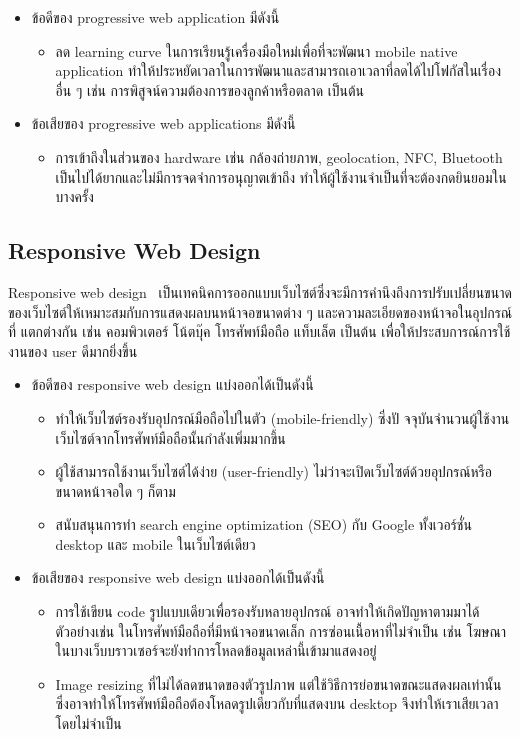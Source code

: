 \begin{itemize}
  \item ข้อดีของ progressive web application มีดังนี้
  \begin{itemize}
    \item ลด learning curve ในการเรียนรู้เครื่องมือใหม่เพื่อที่จะพัฒนา mobile native application ทำให้ประหยัดเวลาในการพัฒนาและสามารถเอาเวลาที่ลดได้ไปโฟกัสในเรื่องอื่น ๆ เช่น การพิสูจน์ความต้องการของลูกค้าหรือตลาด เป็นต้น
  \end{itemize}
  \item ข้อเสียของ progressive web applications มีดังนี้~\cite{bad_pwa}
  \begin{itemize}
    \item การเข้าถึงในส่วนของ hardware เช่น กล้องถ่ายภาพ, geolocation, NFC, Bluetooth เป็นไปได้ยากและไม่มีการจดจำการอนุญาตเข้าถึง ทำให้ผู้ใช้งานจำเป็นที่จะต้องกดยินยอมในบางครั้ง
  \end{itemize}

\end{itemize}

\subsection{Responsive Web Design}
Responsive web design~\cite{responsive} เป็นเทคนิคการออกแบบเว็บไซต์ซึ่งจะมีการคํานึงถึงการปรับเปลี่ยนขนาดของเว็บไซต์ให้เหมาะสมกับการแสดงผลบนหน้าจอขนาดต่าง ๆ และความละเอียดของหน้าจอในอุปกรณ์ที่
แตกต่างกัน เช่น คอมพิวเตอร์ โน้ตบุ๊ค โทรศัพท์มือถือ แท็บเล็ต เป็นต้น เพื่อให้ประสบการณ์การใช้งานของ user ดีมากยิ่งขึ้น
\begin{itemize}
  \item ข้อดีของ responsive web design แบ่งออกได้เป็นดังนี้
  \begin{itemize}
    \item ทําให้เว็บไซต์รองรับอุปกรณ์มือถือไปในตัว (mobile-friendly) ซึ่งปั จจุบันจํานวนผู้ใช้งานเว็บไซต์จากโทรศัพท์มือถือนั้นกําลังเพิ่มมากขึ้น
    \item ผู้ใช้สามารถใช้งานเว็บไซต์ได้ง่าย (user-friendly) ไม่ว่าจะเปิดเว็บไซต์ด้วยอุปกรณ์หรือขนาดหน้าจอใด ๆ ก็ตาม
    \item สนับสนุนการทํา search engine optimization (SEO) กับ Google ทั้งเวอร์ชั่น desktop และ mobile ในเว็บไซต์เดียว
  \end{itemize}
  \item ข้อเสียของ responsive web design แบ่งออกได้เป็นดังนี้~\cite{bad_responsive}
  \begin{itemize}
    \item การใช้เขียน code รูปแบบเดียวเพื่อรองรับหลายอุปกรณ์ อาจทําให้เกิดปัญหาตามมาได้ ตัวอย่างเช่น ในโทรศัพท์มือถือที่มีหน้าจอขนาดเล็ก การซ่อนเนื้อหาที่ไม่จําเป็น เช่น โฆษณา ในบางเว็บบราวเซอร์จะยังทําการโหลดข้อมูลเหล่านี้เข้ามาแสดงอยู่
    \item Image resizing ที่ไม่ได้ลดขนาดของตัวรูปภาพ แต่ใช้วิธีการย่อขนาดขณะแสดงผลเท่านั้น ซึ่งอาจทําให้โทรศัพท์มือถือต้องโหลดรูปเดียวกับที่แสดงบน desktop จึงทําให้เราเสียเวลาโดยไม่จําเป็น
  \end{itemize}
\end{itemize}

